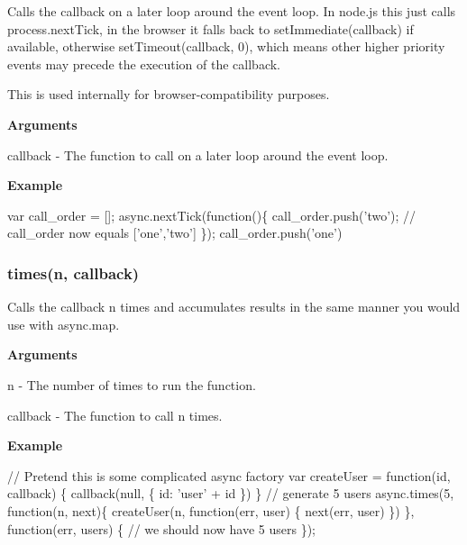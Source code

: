 Calls the callback on a later loop around the event loop. In node.\+js this just calls process.\+next\+Tick, in the browser it falls back to set\+Immediate(callback) if available, otherwise set\+Timeout(callback, 0), which means other higher priority events may precede the execution of the callback.

This is used internally for browser-\/compatibility purposes.

{\bfseries Arguments}


\begin{DoxyItemize}
\item callback -\/ The function to call on a later loop around the event loop.
\end{DoxyItemize}

{\bfseries Example}


\begin{DoxyCode}
var call\_order = [];
async.nextTick(\textcolor{keyword}{function}()\{
    call\_order.push(\textcolor{stringliteral}{'two'});
    \textcolor{comment}{// call\_order now equals ['one','two']}
\});
call\_order.push(\textcolor{stringliteral}{'one'})
\end{DoxyCode}


\label{_times}%
 \subsubsection*{times(n, callback)}

Calls the callback n times and accumulates results in the same manner you would use with async.\+map.

{\bfseries Arguments}


\begin{DoxyItemize}
\item n -\/ The number of times to run the function.
\item callback -\/ The function to call n times.
\end{DoxyItemize}

{\bfseries Example}


\begin{DoxyCode}
\textcolor{comment}{// Pretend this is some complicated async factory}
var createUser = \textcolor{keyword}{function}(id, callback) \{
  callback(null, \{
    \textcolor{keywordtype}{id}: \textcolor{stringliteral}{'user'} + \textcolor{keywordtype}{id}
  \})
\}
\textcolor{comment}{// generate 5 users}
async.times(5, \textcolor{keyword}{function}(n, next)\{
    createUser(n, function(err, user) \{
      next(err, user)
    \})
\}, \textcolor{keyword}{function}(err, users) \{
  \textcolor{comment}{// we should now have 5 users}
\});
\end{DoxyCode}


